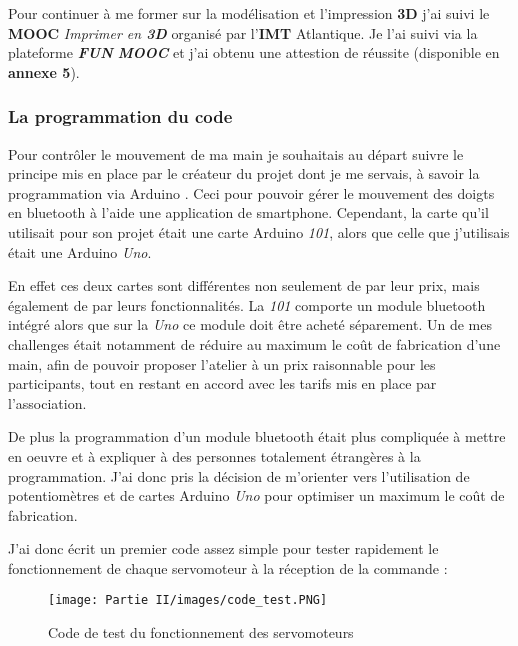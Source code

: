 \vspace{0.5cm}
Pour continuer à me former sur la modélisation et l'impression \textbf{3D} j'ai suivi le \textbf{MOOC} \textit{Imprimer en \textbf{3D}} \cite{imt_imprimer_nodate} organisé par l'\textbf{IMT} Atlantique. Je l'ai suivi via la plateforme \textit{\textbf{FUN} \textbf{MOOC}} et j'ai obtenu une attestion de réussite (disponible en \textbf{annexe 5}).

\newpage

\subsubsection{La programmation du code}

Pour contrôler le mouvement de ma main je souhaitais au départ suivre le principe mis en place par le créateur du projet dont je me servais, à savoir la programmation via Arduino \cite{noauthor_arduino_nodate}. Ceci pour pouvoir gérer le mouvement des doigts en bluetooth à l'aide une application de smartphone. Cependant, la carte qu'il utilisait pour son projet était une carte Arduino \textit{101}, alors que celle que j'utilisais était une Arduino \textit{Uno}.

\vspace{0.5cm}
En effet ces deux cartes sont différentes non seulement de par leur prix, mais également de par leurs fonctionnalités. La \textit{101} comporte un module bluetooth intégré alors que sur la \textit{Uno} ce module doit être acheté séparement. Un de mes challenges était notamment de réduire au maximum le coût de fabrication d'une main, afin de pouvoir proposer l'atelier à un prix raisonnable pour les participants, tout en restant en accord avec les tarifs mis en place par l'association.

\vspace{0.5cm}
De plus la programmation d'un module bluetooth était plus compliquée à mettre en oeuvre et à expliquer à des personnes totalement étrangères à la programmation. J'ai donc pris la décision de m'orienter vers l'utilisation de potentiomètres et de cartes Arduino \textit{Uno} pour optimiser un maximum le coût de fabrication.

\vspace{0.5cm}
J'ai donc écrit un premier code assez simple pour tester rapidement le fonctionnement de chaque servomoteur à la réception de la commande : 

\begin{figure}[!h]
    \centering
    \texttt{[image: Partie II/images/code\_test.PNG]}
    \caption[\, \, Code de test]{Code de test du fonctionnement des servomoteurs}
    \label{fig_4.2.2.1}
\end{figure}

